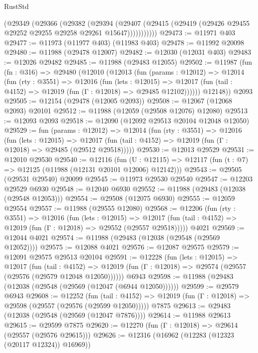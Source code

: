 \begin{lexlean}{RustStd}
\begin{coremodule}
          (@29349
            (@29366
              (@29382
                (@29394
                  (@29407
                    (@29415 (@29419 (@29426 @29455 @29252 @29255 @29258 @29261 @15647)))))))))))
@29473 := @11971 @403
@29477 := @11973 (@11977 @403) (@11983 @403)
@29478 := @11992 @20098
@29480 := @11988 (@29478 @12007)
@29482 := @12030 (@12031 @403)
@29483 := @12026 @29482
@29485 := @11988 (@29483 @12055)
@29502 := @11987
    (fun (fn : @316) =>
    @29480
      (@12010
        (@12013
          (fun (params : @12012) =>
          @12014
            (fun (rty : @3551) =>
            @12016
              (fun (lets : @12015) =>
              @12017 (fun (tail : @4152) => @12019 (fun (Γ : @12018) => @29485 @12102))))))
        @12148))
    @2093
@29505 := @12154 (@29478 (@12005 @2093))
@29508 := @12067 (@12068 @2093) @20101
@29512 := @11988 (@12059 (@29508 @12076) @12080)
@29513 := @12093 @2093
@29518 := @12090 (@12092 @29513 @20104 @12048 @12050)
@29529 := fun (params : @12012) =>
  @12014
    (fun (rty : @3551) =>
    @12016
      (fun (lets : @12015) =>
      @12017 (fun (tail : @4152) => @12019 (fun (Γ : @12018) => @29485 (@29512 @29518)))))
@29530 := @12013 @29529
@29531 := @12010 @29530
@29540 := @12116
    (fun (U : @12115) => @12117 (fun (t : @7) => @12125 (@11988 (@12131 @20101 @12006) @12142)))
@29543 := @29505 (@29531 @29540) @20099
@29545 := @11973 @29530 @29540
@29547 := @12203 @29529 @6930
@29548 := @12040 @6930
@29552 := @11988 (@29483 (@12038 (@29548 @12053)))
@29554 := @29508 (@12075 @6930)
@29555 := @12059 @29554
@29557 := @11988 (@29555 @12080)
@29568 := @12206
    (fun (rty : @3551) =>
    @12016
      (fun (lets : @12015) =>
      @12017 (fun (tail : @4152) => @12019 (fun (Γ : @12018) => @29552 (@29557 @29518)))))
    @4021
@29569 := @12044 @4021
@29574 := @11988 (@29483 (@12038 (@29548 (@29569 @12052))))
@29575 := @12088 @4021
@29576 := @12087 @29575
@29579 := @12091 @29575 @29513 @20104
@29591 := @12228
    (fun (lets : @12015) =>
    @12017
      (fun (tail : @4152) =>
      @12019 (fun (Γ : @12018) => @29574 (@29557 (@29576 (@29579 @12048 @12050))))))
    @6943
@29598 := @11988 (@29483 (@12038 (@29548 (@29569 (@12047 (@6944 @12050))))))
@29599 := @29579 @6943
@29608 := @12252
    (fun (tail : @4152) => @12019 (fun (Γ : @12018) => @29598 (@29557 (@29576 (@29599 @12050)))))
    @7875
@29613 := @29483 (@12038 (@29548 (@29569 (@12047 @7876))))
@29614 := @11988 @29613
@29615 := @29599 @7875
@29620 := @12270 (fun (Γ : @12018) => @29614 (@29557 (@29576 @29615)))
@29626 := @12316 (@16962 (@12283 (@12323 (@20117 @12324)) @16969))

\end{coremodule}
\end{lexlean}
